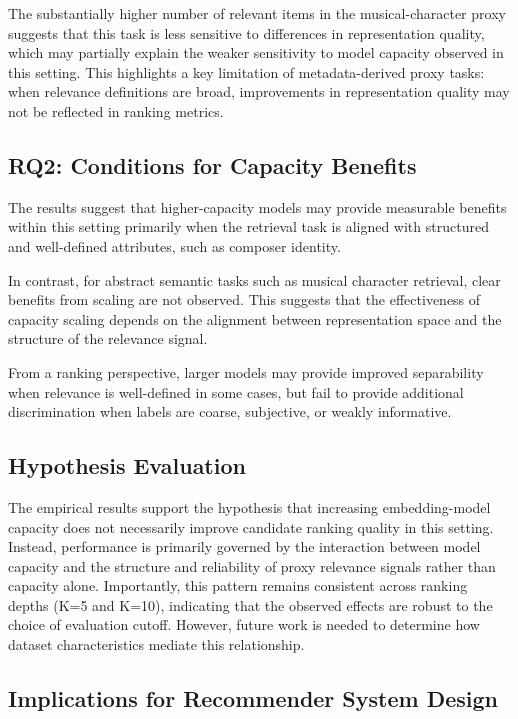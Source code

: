 \documentclass[sigconf]{acmart}
\begin{document}
The substantially higher number of relevant items in the musical-character proxy suggests that this task is less sensitive to differences in representation quality, which may partially explain the weaker sensitivity to model capacity observed in this setting. This highlights a key limitation of metadata-derived proxy tasks: when relevance definitions are broad, improvements in representation quality may not be reflected in ranking metrics.

\subsection{RQ2: Conditions for Capacity Benefits}

The results suggest that higher-capacity models may provide measurable benefits within this setting primarily when the retrieval task is aligned with structured and well-defined attributes, such as composer identity.

In contrast, for abstract semantic tasks such as musical character retrieval, clear benefits from scaling are not observed. This suggests that the effectiveness of capacity scaling depends on the alignment between representation space and the structure of the relevance signal.

From a ranking perspective, larger models may provide improved separability when relevance is well-defined in some cases, but fail to provide additional discrimination when labels are coarse, subjective, or weakly informative.

\subsection{Hypothesis Evaluation}

The empirical results support the hypothesis that increasing embedding-model capacity does not necessarily improve candidate ranking quality in this setting. Instead, performance is primarily governed by the interaction between model capacity and the structure and reliability of proxy relevance signals rather than capacity alone. Importantly, this pattern remains consistent across ranking depths (K=5 and K=10), indicating that the observed effects are robust to the choice of evaluation cutoff. However, future work is needed to determine how dataset characteristics mediate this relationship.

\subsection{Implications for Recommender System Design}
\end{document}
